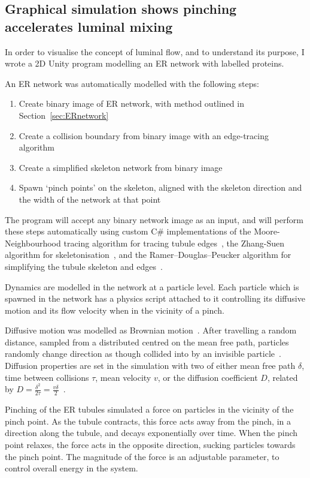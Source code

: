 \subsection{Graphical simulation shows pinching accelerates luminal mixing}
In order to visualise the concept of luminal flow, and to understand its purpose, I wrote a 2D Unity program modelling an ER network with labelled proteins.

An ER network was automatically modelled with the following steps:
\begin{enumerate}
	\item Create binary image of ER network, with method outlined in Section~\ref{sec:ERnetwork}
	\item Create a collision boundary from binary image with an edge-tracing algorithm
	\item Create a simplified skeleton network from binary image
	\item Spawn `pinch points' on the skeleton, aligned with the skeleton direction and the width of the network at that point
\end{enumerate}
The program will accept any binary network image as an input, and will perform these steps automatically using custom C\# implementations of the Moore-Neighbourhood tracing algorithm for tracing tubule edges~\cite{moore-neighbourhood}, the Zhang-Suen algorithm for skeletonisation~\cite{zhang1984fast}, and the Ramer–Douglas–Peucker algorithm for simplifying the tubule skeleton and edges~\cite{ramer1972iterative, douglas1973algorithms}.

Dynamics are modelled in the network at a particle level.
Each particle which is spawned in the network has a physics script attached to it controlling its diffusive motion and its flow velocity when in the vicinity of a pinch.

Diffusive motion was modelled as Brownian motion~\cite{einstein1905molekularkinetischen}.
After travelling a random distance, sampled from a distributed centred on the mean free path, particles randomly change direction as though collided into by an invisible particle~\cite{lucretius1631}.
Diffusion properties are set in the simulation with two of either mean free path $\delta$, time between collisions $\tau$, mean velocity $v$, or the diffusion coefficient $D$, related by $D=\frac{\delta^2}{2\tau}=\frac{v\delta}{2}$~\cite[\textit{ch. 19}]{fishbane1998physics}.

Pinching of the ER tubules simulated a force on particles in the vicinity of the pinch point.
As the tubule contracts, this force acts away from the pinch, in a direction along the tubule, and decays exponentially over time.
When the pinch point relaxes, the force acts in the opposite direction, sucking particles towards the pinch point.
The magnitude of the force is an adjustable parameter, to control overall energy in the system.

